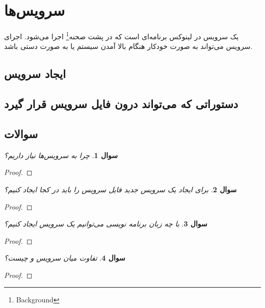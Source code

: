 \documentclass{article}
\newtheorem{question}{سوال}
\begin{document}
\section{سرویس‌ها}
یک سرویس در لینوکس برنامه‌ای است که در پشت صحنه\footnote{Background} اجرا می‌شود. اجرای سرویس می‌تواند به صورت خودکار هنگام بالا آمدن سیستم یا به صورت دستی  باشد. 
\subsection{ایجاد سرویس}
\subsection{دستوراتی که می‌تواند درون فایل سرویس قرار گیرد}
\subsubsection{\lr{[UNIT]}}


\subsection{سوالات}
\begin{question}
چرا به سرویس‌ها نیاز داریم؟
\end{question}
\begin{proof}
\end{proof}
\begin{question}

برای ایجاد یک سرویس جدید فایل سرویس را باید در کجا ایجاد کنیم؟
\end{question}
\begin{proof}
\end{proof}
\begin{question}

با چه زبان برنامه نویسی می‌توانیم یک سرویس ایجاد کنیم؟
\end{question}
\begin{proof}
\end{proof}
\begin{question}

تفاوت میان سرویس و  چیست؟
\end{question}
\begin{proof}
\end{proof}
\end{document}
